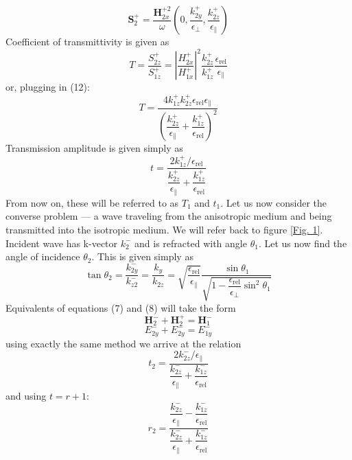 \documentclass[a4paper]{scrartcl}
\begin{document}
\begin{equation}
      \mathbf{S}_2^+ = \dfrac{\mathbf{H}_{2x}^{+2}}{\omega}(0,\dfrac{k_{2y}^+}{\epsilon_\bot},
      \dfrac{k_{2z}^+}{\epsilon_\parallel})
\end{equation}
Coefficient of transmittivity is given as
\begin{equation}
      T = \dfrac{S_{2z}^+}{S_{1z}^+} = \left| \dfrac{H_{2x}^+}{H_{1x}^+} \right| ^2 \dfrac{k_{2z}^+}{k_{1z}^+}
      \dfrac{\epsilon_\textrm{rel}}{\epsilon_\parallel}
\end{equation}
or, plugging in (12):
\begin{equation}
      T = \dfrac{4 k_{1z}^+ k_{2z}^+ \epsilon_\textrm{rel} \epsilon_\parallel}{\left(
      \dfrac{k_{2z}^+}{\epsilon_\parallel} + \dfrac{k_{1z}^+}{\epsilon_\textrm{rel}} \right)^2}
\end{equation}
Transmission amplitude is given simply as
\begin{equation}
      t = \dfrac{2k_{1z}^+ / \epsilon_\textrm{rel}}{\dfrac{k_{2z}^+}{\epsilon_\parallel} +
\dfrac{k_{1z}^+}{\epsilon_\textrm{rel} }}
\end{equation}
From now on, these will be referred to as $T_1$ and $t_1$. Let us now consider the converse problem --- a wave traveling
from the anisotropic medium and being transmitted into the isotropic medium. We will refer back to figure \ref{Fig. 1}.
Incident wave has k-vector $k_{2}^-$ and is refracted with angle $\theta_1$. Let us now find the angle of incidence
$\theta_2$. This is given simply as
\begin{equation}
      \tan \theta_2 = \dfrac{k_{2y}^-}{k_{z2}^-} = \dfrac{k_y}{k_{2z}} =
      \sqrt{\dfrac{\epsilon_\textrm{rel}}{\epsilon_\parallel}} \dfrac{\sin \theta_1}
      {\sqrt{1-\dfrac{\epsilon_\textrm{rel}}{\epsilon_\bot}\sin^2 \theta_1}}
\end{equation}
Equivalents of equations (7) and (8) will take the form
\begin{equation}
      \mathbf{H}_2^- + \mathbf{H}_2^+ = \mathbf{H}_1^-
\end{equation}
\begin{equation}
      E_{2y}^- + E_{2y}^- = E_{1y}^-
\end{equation}
using exactly the same method we arrive at the relation
\begin{equation}
      t_2 = \dfrac{2 k_{2z}^- /\epsilon_\parallel}{\dfrac{k_{2z}^-}{\epsilon_\parallel} +
      \dfrac{k_{1z}^-}{\epsilon_\textrm{rel} }}
\end{equation}
and using $t = r + 1$:
\begin{equation}
      r_2 = \dfrac{ \dfrac{k_{2z}^-}{\epsilon_\parallel} - \dfrac{k_{1z}^-}{\epsilon_\textrm{rel}} }{ \dfrac{k_{2z}^-}{\epsilon_\parallel} + \dfrac{k_{1z}^-}{\epsilon_\textrm{rel}} }
\end{equation}
\newpage
\end{document}
